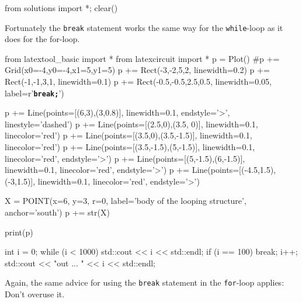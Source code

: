 \begin{python0}
from solutions import *; clear()
\end{python0}

Fortunately the \texttt{break} statement works the same way for the
\texttt{while}-loop as it does for the for-loop.
\begin{python}
from latextool_basic import *
from latexcircuit import *
p = Plot()
#p += Grid(x0=-4,y0=-4,x1=5,y1=5)
p += Rect(-3,-2,5,2, linewidth=0.2)
p += Rect(-1,-1,3,1, linewidth=0.1)
p += Rect(-0.5,-0.5,2.5,0.5, linewidth=0.05, label=r'\texttt{\textbf{break;}}')


p += Line(points=[(6,3),(3,0.8)], linewidth=0.1, endstyle='>', linestyle='dashed')
p += Line(points=[(2.5,0),(3.5, 0)], linewidth=0.1, linecolor='red')
p += Line(points=[(3.5,0),(3.5,-1.5)], linewidth=0.1, linecolor='red')
p += Line(points=[(3.5,-1.5),(5,-1.5)], linewidth=0.1, linecolor='red', endstyle='>')
p += Line(points=[(5,-1.5),(6,-1.5)], linewidth=0.1, linecolor='red', endstyle='>')
p += Line(points=[(-4.5,1.5),(-3,1.5)], linewidth=0.1, linecolor='red', endstyle='>')

X = POINT(x=6, y=3, r=0, label='body of the looping structure', anchor='south')
p += str(X)

print(p)
\end{python}

\begin{console}
int i = 0;
while (i < 1000)
{     
      std::cout << i << std::endl;
      if (i == 100) break;
      i++;
}
std::cout << "out ... " << i << std::endl;
\end{console}

Again, the same advice for using the \texttt{break} statement in the
\texttt{for}-loop applies: Don't overuse it.


